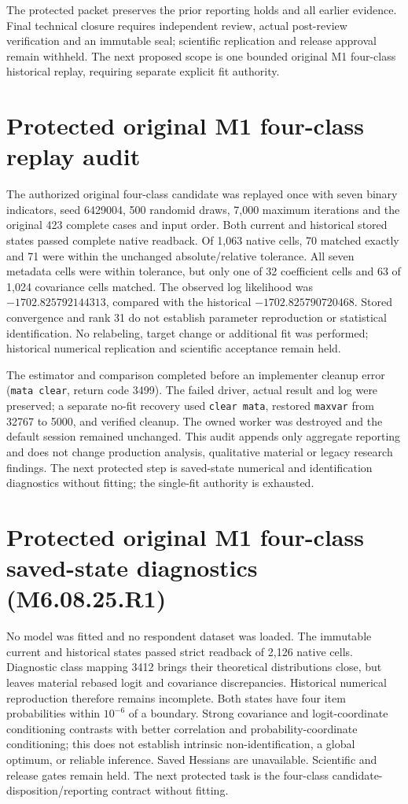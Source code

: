 \documentclass[11pt,a4paper]{article}
\begin{document}
The protected packet preserves the prior reporting holds and all earlier
evidence. Final technical closure requires independent review, actual post-review
verification and an immutable seal; scientific replication and release approval
remain withheld. The next proposed scope is one bounded original M1 four-class
historical replay, requiring separate explicit fit authority.


\section*{Protected original M1 four-class replay audit}
The authorized original four-class candidate was replayed once with seven binary
indicators, seed 6429004, 500 randomid draws, 7,000 maximum iterations and the
original 423 complete cases and input order. Both current and historical stored
states passed complete native readback. Of 1,063 native cells, 70 matched exactly
and 71 were within the unchanged absolute/relative tolerance. All seven metadata
cells were within tolerance, but only one of 32 coefficient cells and 63 of 1,024
covariance cells matched. The observed log likelihood was
$-1702.825792144313$, compared with the historical $-1702.825790720468$.
Stored convergence and rank 31 do not establish parameter reproduction or
statistical identification. No relabeling, target change or additional fit was
performed; historical numerical replication and scientific acceptance remain held.

The estimator and comparison completed before an implementer cleanup error
(\texttt{mata clear}, return code 3499). The failed driver, actual result and log
were preserved; a separate no-fit recovery used \texttt{clear mata}, restored
\texttt{maxvar} from 32767 to 5000, and verified cleanup. The owned worker was
destroyed and the default session remained unchanged. This audit appends only
aggregate reporting and does not change production analysis, qualitative material
or legacy research findings. The next protected step is saved-state numerical and
identification diagnostics without fitting; the single-fit authority is exhausted.

\section*{Protected original M1 four-class saved-state diagnostics (M6.08.25.R1)}
No model was fitted and no respondent dataset was loaded. The immutable current
and historical states passed strict readback of 2,126 native cells. Diagnostic
class mapping 3412 brings their theoretical distributions close, but leaves
material rebased logit and covariance discrepancies. Historical numerical
reproduction therefore remains incomplete. Both states have four item
probabilities within $10^{-6}$ of a boundary. Strong covariance and
logit-coordinate conditioning contrasts with better correlation and
probability-coordinate conditioning; this does not establish intrinsic
non-identification, a global optimum, or reliable inference. Saved Hessians are
unavailable. Scientific and release gates remain held. The next protected task
is the four-class candidate-disposition/reporting contract without fitting.
\end{document}
